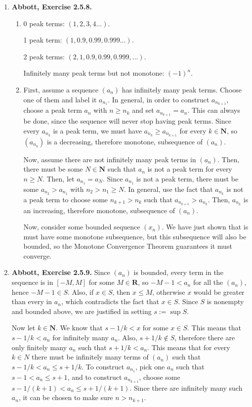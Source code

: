 \documentclass{article}
\newcommand{\N}{\mathbf{N}}
\newcommand{\R}{\mathbf{R}}
\newcommand{\exc}[2][Abbott]{\item \textbf{#1, Exercise #2.}}
\begin{document}
\begin{enumerate}
    \exc{2.5.8}
    \begin{enumerate}
        \item 
        0 peak terms: $(1,2,3,4 \dots)$.
        
        1 peak term: \space $(1,0.9,0.99,0.999 \dots)$.
        
        2 peak terms: $(2,1,0.9,0.99, 0.999, \dots)$.
        
        Infinitely many peak terms but not monotone: $(-1)^n$.
        
        \item First, assume a sequence $(a_n)$ has infinitely many peak terms. Choose one of them and label it $a_{n_1}$. In general, in order to construct $a_{n_{k+1}}$, choose a peak term $a_n$ with $n \geq n_k$ and set $a_{n_{k+1}} = a_n$. This can always be done, since the sequence will never stop having peak terms. Since every $a_{n_k}$ is a peak term, we must have $a_{n_k} \geq a_{n_{k+1}}$ for every $k \in \N$, so $(a_{n_k})$ is a decreasing, therefore monotone, subsequence of $(a_n)$.
        
        Now, assume there are not infinitely many peak terms in $(a_n)$. Then, there must be some $N \in \N$ such that $a_n$ is not a peak term for every $n \geq N$. Then, let $a_{n_1} = a_N$. Since $a_{n_1}$ is not a peak term, there must be some $a_{n_2} > a_{n_1}$ with $n_2 > n_1 \geq N$. In general, use the fact that $a_{n_k}$ is not a peak term to choose some $n_{k+1} > n_k$ such that $a_{n_{k+1}} > a_{n_k}$. Then, $a_{n_k}$ is an increasing, therefore monotone, subsequence of $(a_n)$.
        
        Now, consider some bounded sequence $(x_n)$. We have just shown that is must have some monotone subsequence, but this subsequence will also be bounded, so the Monotone Convergence Theorem guarantees it must converge. 
    \end{enumerate}
    
    \exc{2.5.9}
    Since $(a_n)$ is bounded, every term in the sequence is in $[-M, M]$ for some $M \in \R$, so $-M-1 < a_n$ for all the $(a_n)$, hence $-M-1 \in S$. Also, if $x \in S$, then $x \leq M$, otherwise $x$ would be greater than every in $a_n$, which contradicts the fact that $x \in S$. Since $S$ is nonempty and bounded above, we are justified in setting $s := \sup S$.
    
    Now let $k \in \N$. We know that $s-1/k < x$ for some $x \in S$. This means that $s-1/k < a_n$ for infinitely many $a_n$. Also, $s + 1/k \notin S$, therefore there are only finitely many $a_n$ such that $ s + 1/k < a_n$. This means that for every $k \in N$ there must be infinitely many terms of $(a_n)$ such that $s-1/k < a_n \leq s+1/k$. To construct $a_{n_1}$, pick one $a_n$ such that $s-1 < a_n \leq s+1$, and to construct $a_{n_{k+1}}$, choose some $s-1/(k+1) < a_n \leq s+1/(k+1)$. Since there are infinitely many such $a_n$, it can be chosen to make sure $n > n_{k+1}$.
    

\end{enumerate}
\end{document}
